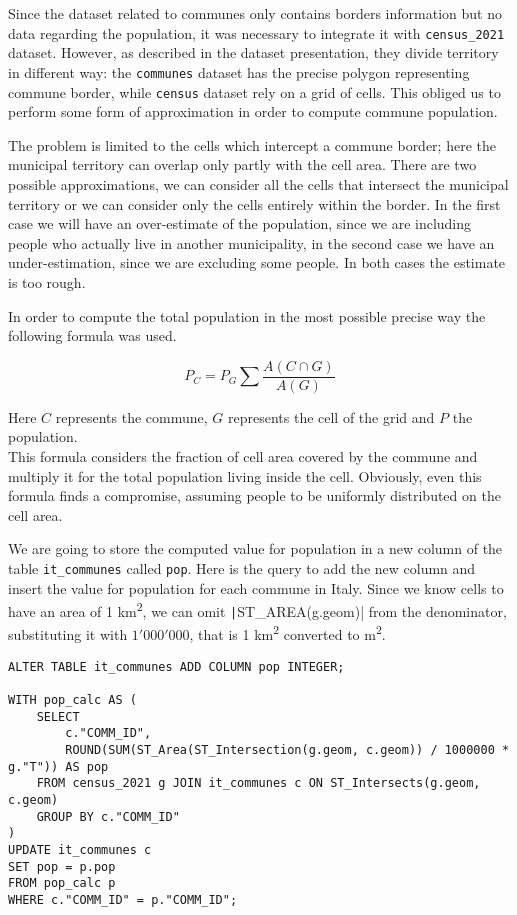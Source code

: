 Since the dataset related to communes only contains borders information but no data regarding the population, it was necessary to integrate it with \texttt{census\_2021} dataset.
However, as described in the dataset presentation, they divide territory in different way: the \texttt{communes} dataset has the precise polygon representing commune border, while \texttt{census} dataset rely on a grid of cells.
This obliged us to perform some form of approximation in order to compute commune population.

The problem is limited to the cells which intercept a commune border; here the municipal territory can overlap only partly with the cell area.
There are two possible approximations, we can consider all the cells that intersect the municipal territory or we can consider only the cells entirely within the border.
In the first case we will have an over-estimate of the population, since we are including people who actually live in another municipality, in the second case we have an under-estimation, since we are excluding some people.
In both cases the estimate is too rough.

In order to compute the total population in the most possible precise way the following formula was used.

\begin{equation}
	P_{C} = P_{G} \sum \frac{A(C \cap G)}{A(G)}
\end{equation}

Here $C$ represents the commune, $G$ represents the cell of the grid and $P$ the population.\\
This formula considers the fraction of cell area covered by the commune and multiply it for the total population living inside the cell.
Obviously, even this formula finds a compromise, assuming people to be uniformly distributed on the cell area.

We are going to store the computed value for population in a new column of the table \texttt{it\_communes} called \texttt{pop}.
Here is the query to add the new column and insert the value for population for each commune in Italy.
Since we know cells to have an area of 1 km\textsuperscript{2}, we can omit \texttt|ST_AREA(g.geom)| from the denominator, substituting it with $1'000'000$, that is 1 km\textsuperscript{2} converted to m\textsuperscript{2}.

\begin{verbatim}
ALTER TABLE it_communes ADD COLUMN pop INTEGER;

WITH pop_calc AS (
	SELECT 
		c."COMM_ID",
		ROUND(SUM(ST_Area(ST_Intersection(g.geom, c.geom)) / 1000000 * g."T")) AS pop
	FROM census_2021 g JOIN it_communes c ON ST_Intersects(g.geom, c.geom)
	GROUP BY c."COMM_ID"
)
UPDATE it_communes c
SET pop = p.pop
FROM pop_calc p
WHERE c."COMM_ID" = p."COMM_ID";
\end{verbatim}



